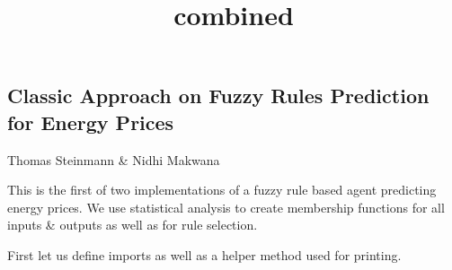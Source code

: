\documentclass[11pt]{article}
\title{combined}
\begin{document}
    
    
    \maketitle
    
    

    
    \subsection{Classic Approach on Fuzzy Rules Prediction for Energy
Prices}\label{classic-approach-on-fuzzy-rules-prediction-for-energy-prices}

Thomas Steinmann \& Nidhi Makwana

This is the first of two implementations of a fuzzy rule based agent
predicting energy prices. We use statistical analysis to create
membership functions for all inputs \& outputs as well as for rule
selection.

First let us define imports as well as a helper method used for
printing.
\end{document}
